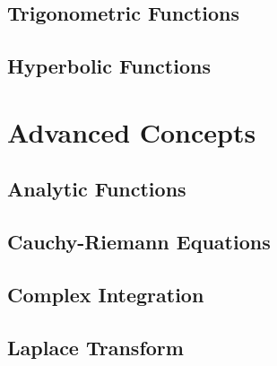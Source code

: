 \documentclass[12pt]{article}
\begin{document}
    \subsection{Trigonometric Functions}
    \subsection{Hyperbolic Functions}

    \section{Advanced Concepts}
    \subsection{Analytic Functions}
    \subsection{Cauchy-Riemann Equations}
    \subsection{Complex Integration}
    \subsection{Laplace Transform}
\end{document}
